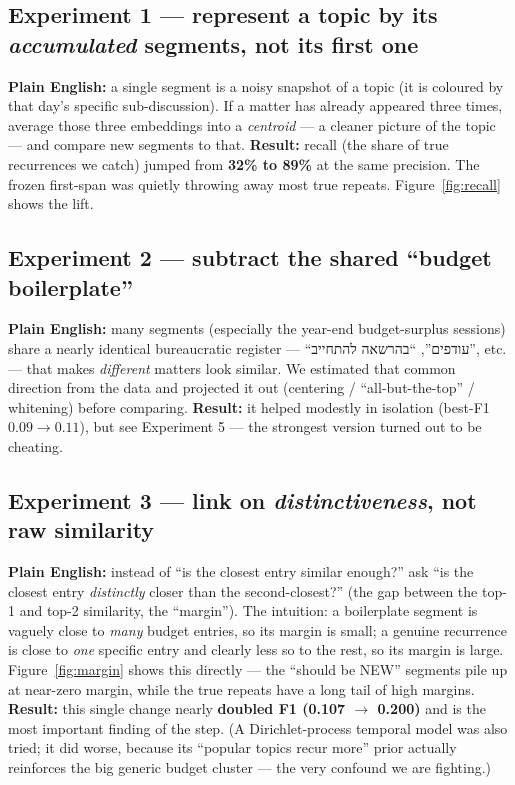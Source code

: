 \documentclass[11pt,a4paper]{article}
\begin{document}
\subsection{Experiment 1 --- represent a topic by its \emph{accumulated} segments, not its first one}
\textbf{Plain English:} a single segment is a noisy snapshot of a topic (it is coloured by
that day's specific sub-discussion). If a matter has already appeared three times, average
those three embeddings into a \emph{centroid} --- a cleaner picture of the topic --- and
compare new segments to that. \textbf{Result:} recall (the share of true recurrences we
catch) jumped from \textbf{32\% to 89\%} at the same precision. The frozen first-span was
quietly throwing away most true repeats. Figure~\ref{fig:recall} shows the lift.

\subsection{Experiment 2 --- subtract the shared ``budget boilerplate''}
\textbf{Plain English:} many segments (especially the year-end budget-surplus sessions)
share a nearly identical bureaucratic register --- ``\texthebrew{עודפים}'', ``\texthebrew{בהרשאה להתחייב}'', etc. ---
that makes \emph{different} matters look similar. We estimated that common direction from the
data and projected it out (centering / ``all-but-the-top'' / whitening) before comparing.
\textbf{Result:} it helped modestly in isolation (best-F1 $0.09\to0.11$), but see Experiment 5
--- the strongest version turned out to be cheating.

\subsection{Experiment 3 --- link on \emph{distinctiveness}, not raw similarity}
\textbf{Plain English:} instead of ``is the closest entry similar enough?'' ask ``is the
closest entry \emph{distinctly} closer than the second-closest?'' (the gap between the top-1
and top-2 similarity, the ``margin''). The intuition: a boilerplate segment is vaguely close
to \emph{many} budget entries, so its margin is small; a genuine recurrence is close to
\emph{one} specific entry and clearly less so to the rest, so its margin is large.
Figure~\ref{fig:margin} shows this directly --- the ``should be NEW'' segments pile up at
near-zero margin, while the true repeats have a long tail of high margins. \textbf{Result:}
this single change nearly \textbf{doubled F1 (0.107 $\to$ 0.200)} and is the most important
finding of the step. (A Dirichlet-process temporal model was also tried; it did worse,
because its ``popular topics recur more'' prior actually reinforces the big generic budget
cluster --- the very confound we are fighting.)
\end{document}
